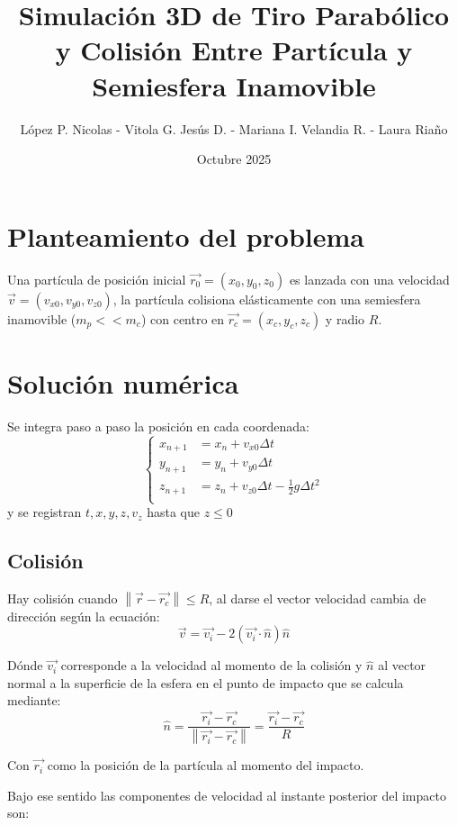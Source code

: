 \documentclass[a4paper,10pt]{article}
\title{Simulación 3D de Tiro Parabólico y Colisión Entre Partícula y Semiesfera Inamovible}
\author{López P. Nicolas - Vitola G. Jesús D. - Mariana I. Velandia R. - Laura Riaño}
\date{Octubre 2025}
\begin{document}
	\maketitle
	
	\section{Planteamiento del problema}
	Una partícula de posición inicial \(\overrightarrow{r_0}=(x_0, y_0, z_0)\) es lanzada con una velocidad \(\overrightarrow{v}=(v_{x0}, v_{y0}, v_{z0})\), la partícula colisiona elásticamente con una semiesfera inamovible (\(m_p<<m_c\)) con centro en \(\overrightarrow{r_c}=(x_c, y_c, z_c)\) y radio \(R\).
	
	\section{Solución numérica}
	Se integra paso a paso la posición en cada coordenada:
	\[
	\begin{cases}
		x_{n+1} &= x_n + v_{x0} \Delta t\\
		y_{n+1} &= y_n + v_{y0} \Delta t\\
		z_{n+1} &= z_n + v_{z0}\Delta t - \frac{1}{2} g \Delta t^2\\
	\end{cases}
	\]
	y se registran \(t, x, y, z, v_z\) hasta que \(z\le0\)
	
	\subsection{Colisión}
	Hay colisión cuando \(\left\| \overrightarrow{r}-\overrightarrow{r_c} \right\| \le R\), al darse el vector velocidad cambia de dirección según la ecuación:
	\[
	\overrightarrow{v}=\overrightarrow{v_i}-2(\overrightarrow{v_i} \cdot \hat{n} )\hat{n}
	\]
	
	Dónde \(\overrightarrow{v_i}\) corresponde a la velocidad al momento de la colisión y \(\hat{n}\) al vector normal a la superficie de la esfera en el punto de impacto que se calcula mediante:
	\[
	\hat{n}=\frac{\overrightarrow{r_i}-\overrightarrow{r_c}}{\left\| \overrightarrow{r_i}-\overrightarrow{r_c} \right\|} = \frac{\overrightarrow{r_i}-\overrightarrow{r_c}}{R}
	\]
	
	Con \(\overrightarrow{r_i}\) como la posición de la partícula al momento del impacto.
	
	Bajo ese sentido las componentes de velocidad al instante posterior del impacto son:
	
\end{document}

